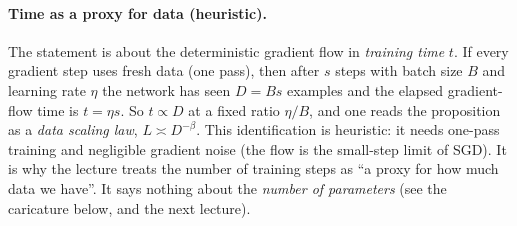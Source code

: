 \paragraph{Time as a proxy for data (heuristic).} The statement is about the deterministic gradient flow in \emph{training time} $t$. If every gradient step uses fresh data (one pass), then after $s$ steps with batch size $B$ and learning rate $\eta$ the network has seen $D=Bs$ examples and the elapsed gradient-flow time is $t=\eta s$. So
$t\propto D$ at a fixed ratio $\eta/B$, and one reads the proposition as a \emph{data scaling law}, $L\asymp D^{-\beta}$. This identification is heuristic: it needs one-pass training and negligible gradient noise (the flow is the small-step limit of SGD). It is why the lecture treats the number of training steps as ``a proxy for how much data we have''. It says nothing about the \emph{number of parameters} (see the caricature below, and the next lecture).

